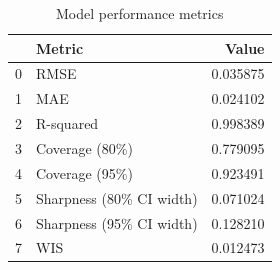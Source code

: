 \begin{table}[htbp]
\caption{Model performance metrics}
\label{tab:metrics_summary}
\begin{tabular}{llr}
\toprule
 & Metric & Value \\
\midrule
0 & RMSE & 0.035875 \\
1 & MAE & 0.024102 \\
2 & R-squared & 0.998389 \\
3 & Coverage (80\%) & 0.779095 \\
4 & Coverage (95\%) & 0.923491 \\
5 & Sharpness (80\% CI width) & 0.071024 \\
6 & Sharpness (95\% CI width) & 0.128210 \\
7 & WIS & 0.012473 \\
\bottomrule
\end{tabular}
\end{table}
